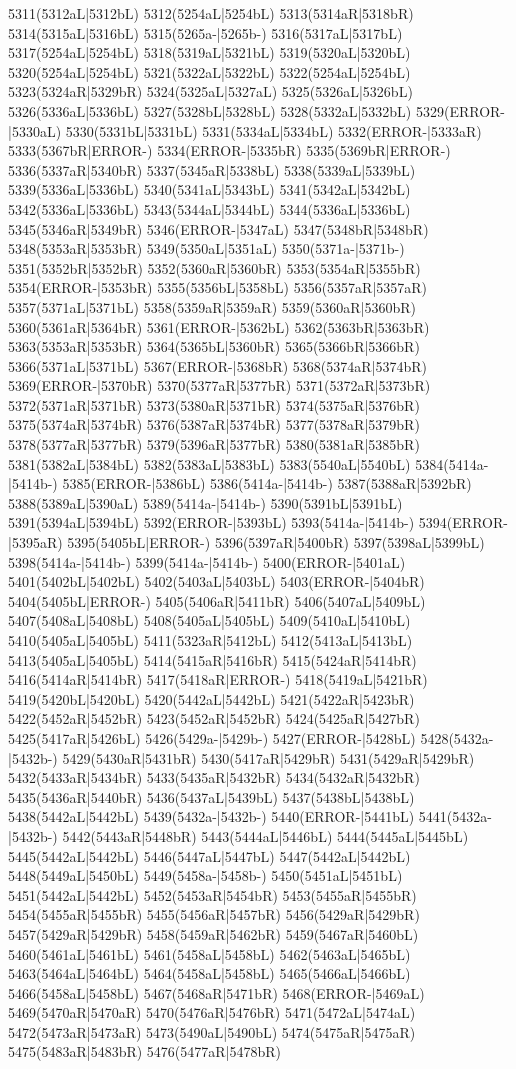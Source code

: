5311(5312aL|5312bL) 5312(5254aL|5254bL) 5313(5314aR|5318bR) 5314(5315aL|5316bL) 5315(5265a-|5265b-) 5316(5317aL|5317bL) 5317(5254aL|5254bL) 5318(5319aL|5321bL) 5319(5320aL|5320bL) 5320(5254aL|5254bL) 5321(5322aL|5322bL) 5322(5254aL|5254bL) 5323(5324aR|5329bR) 5324(5325aL|5327aL) 5325(5326aL|5326bL) 5326(5336aL|5336bL) 5327(5328bL|5328bL) 5328(5332aL|5332bL) 5329(ERROR-|5330aL) 5330(5331bL|5331bL) 5331(5334aL|5334bL) 5332(ERROR-|5333aR) 5333(5367bR|ERROR-) 5334(ERROR-|5335bR) 5335(5369bR|ERROR-) 5336(5337aR|5340bR) 5337(5345aR|5338bL) 5338(5339aL|5339bL) 5339(5336aL|5336bL) 5340(5341aL|5343bL) 5341(5342aL|5342bL) 5342(5336aL|5336bL) 5343(5344aL|5344bL) 5344(5336aL|5336bL) 5345(5346aR|5349bR) 5346(ERROR-|5347aL) 5347(5348bR|5348bR) 5348(5353aR|5353bR) 5349(5350aL|5351aL) 5350(5371a-|5371b-) 5351(5352bR|5352bR) 5352(5360aR|5360bR) 5353(5354aR|5355bR) 5354(ERROR-|5353bR) 5355(5356bL|5358bL) 5356(5357aR|5357aR) 5357(5371aL|5371bL) 5358(5359aR|5359aR) 5359(5360aR|5360bR) 5360(5361aR|5364bR) 5361(ERROR-|5362bL) 5362(5363bR|5363bR) 5363(5353aR|5353bR) 5364(5365bL|5360bR) 5365(5366bR|5366bR) 5366(5371aL|5371bL) 5367(ERROR-|5368bR) 5368(5374aR|5374bR) 5369(ERROR-|5370bR) 5370(5377aR|5377bR) 5371(5372aR|5373bR) 5372(5371aR|5371bR) 5373(5380aR|5371bR) 5374(5375aR|5376bR) 5375(5374aR|5374bR) 5376(5387aR|5374bR) 5377(5378aR|5379bR) 5378(5377aR|5377bR) 5379(5396aR|5377bR) 5380(5381aR|5385bR) 5381(5382aL|5384bL) 5382(5383aL|5383bL) 5383(5540aL|5540bL) 5384(5414a-|5414b-) 5385(ERROR-|5386bL) 5386(5414a-|5414b-) 5387(5388aR|5392bR) 5388(5389aL|5390aL) 5389(5414a-|5414b-) 5390(5391bL|5391bL) 5391(5394aL|5394bL) 5392(ERROR-|5393bL) 5393(5414a-|5414b-) 5394(ERROR-|5395aR) 5395(5405bL|ERROR-) 5396(5397aR|5400bR) 5397(5398aL|5399bL) 5398(5414a-|5414b-) 5399(5414a-|5414b-) 5400(ERROR-|5401aL) 5401(5402bL|5402bL) 5402(5403aL|5403bL) 5403(ERROR-|5404bR) 5404(5405bL|ERROR-) 5405(5406aR|5411bR) 5406(5407aL|5409bL) 5407(5408aL|5408bL) 5408(5405aL|5405bL) 5409(5410aL|5410bL) 5410(5405aL|5405bL) 5411(5323aR|5412bL) 5412(5413aL|5413bL) 5413(5405aL|5405bL) 5414(5415aR|5416bR) 5415(5424aR|5414bR) 5416(5414aR|5414bR) 5417(5418aR|ERROR-) 5418(5419aL|5421bR) 5419(5420bL|5420bL) 5420(5442aL|5442bL) 5421(5422aR|5423bR) 5422(5452aR|5452bR) 5423(5452aR|5452bR) 5424(5425aR|5427bR) 5425(5417aR|5426bL) 5426(5429a-|5429b-) 5427(ERROR-|5428bL) 5428(5432a-|5432b-) 5429(5430aR|5431bR) 5430(5417aR|5429bR) 5431(5429aR|5429bR) 5432(5433aR|5434bR) 5433(5435aR|5432bR) 5434(5432aR|5432bR) 5435(5436aR|5440bR) 5436(5437aL|5439bL) 5437(5438bL|5438bL) 5438(5442aL|5442bL) 5439(5432a-|5432b-) 5440(ERROR-|5441bL) 5441(5432a-|5432b-) 5442(5443aR|5448bR) 5443(5444aL|5446bL) 5444(5445aL|5445bL) 5445(5442aL|5442bL) 5446(5447aL|5447bL) 5447(5442aL|5442bL) 5448(5449aL|5450bL) 5449(5458a-|5458b-) 5450(5451aL|5451bL) 5451(5442aL|5442bL) 5452(5453aR|5454bR) 5453(5455aR|5455bR) 5454(5455aR|5455bR) 5455(5456aR|5457bR) 5456(5429aR|5429bR) 5457(5429aR|5429bR) 5458(5459aR|5462bR) 5459(5467aR|5460bL) 5460(5461aL|5461bL) 5461(5458aL|5458bL) 5462(5463aL|5465bL) 5463(5464aL|5464bL) 5464(5458aL|5458bL) 5465(5466aL|5466bL) 5466(5458aL|5458bL) 5467(5468aR|5471bR) 5468(ERROR-|5469aL) 5469(5470aR|5470aR) 5470(5476aR|5476bR) 5471(5472aL|5474aL) 5472(5473aR|5473aR) 5473(5490aL|5490bL) 5474(5475aR|5475aR) 5475(5483aR|5483bR) 5476(5477aR|5478bR) 